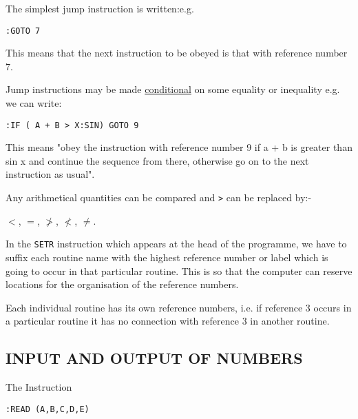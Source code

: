 \documentclass[10pt, a4paper, oneside]{article}
\newcommand{\myuline}[1]{\uline{#1}}
\newcommand{\mytt}[1]{\texttt{\footnotesize #1}}
\begin{document}
\begin{multicols}{2}
The simplest jump instruction is written:e.g.

\begin{addmargin}[1cm]{1em}%
\begin{lstlisting}
:GOTO 7
\end{lstlisting}
\end{addmargin}

This means that the next instruction to be
obeyed is that with reference number 7.

Jump instructions may be made \myuline{conditional}
on some equality or inequality e.g. we can write:

\begin{addmargin}[1cm]{1em}%
\begin{lstlisting}
:IF ( A + B > X:SIN) GOTO 9
\end{lstlisting}
\end{addmargin}

This means "obey the instruction with
reference number 9 if a + b is greater than sin x
and continue the sequence from there, otherwise go on
to the next instruction as usual".

Any arithmetical quantities can be compared
and \mytt{>} can be replaced by:-

\begin{addmargin}[1cm]{1em}%
$<$, $=$, $\ngtr$, $\nless$, $\ne$.
\end{addmargin}

In the \mytt{SETR} instruction which appears at the
head of the programme, we have to suffix each routine
name with the highest reference number or label which
is going to occur in that particular routine.  This
is so that the computer can reserve locations for the
organisation of the reference numbers.

Each individual routine has its own reference
numbers, i.e. if reference 3 occurs in a particular
routine it has no connection with reference 3 in
another routine.

\subsection{INPUT AND OUTPUT OF NUMBERS}

The Instruction

\begin{addmargin}[1cm]{1em}%
\begin{lstlisting}
:READ (A,B,C,D,E)
\end{lstlisting}
\end{addmargin}


\end{multicols}
\end{document}
